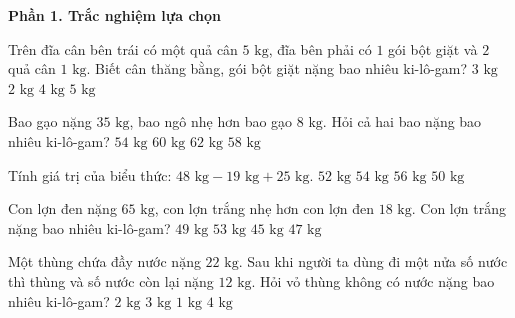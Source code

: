 \textbf{Phần 1. Trắc nghiệm lựa chọn}

\begin{ex} %
Trên đĩa cân bên trái có một quả cân $5\text{ kg}$, đĩa bên phải có $1$ gói bột giặt và $2$ quả cân $1\text{ kg}$. Biết cân thăng bằng, gói bột giặt nặng bao nhiêu ki-lô-gam?
\choice
{\True $3\text{ kg}$}
{$2\text{ kg}$}
{$4\text{ kg}$}
{$5\text{ kg}$}
\end{ex}

\begin{ex} %
Bao gạo nặng $35\text{ kg}$, bao ngô nhẹ hơn bao gạo $8\text{ kg}$. Hỏi cả hai bao nặng bao nhiêu ki-lô-gam?
\choice
{$54\text{ kg}$}
{$60\text{ kg}$}
{\True $62\text{ kg}$}
{$58\text{ kg}$}
\end{ex}

\begin{ex} %
Tính giá trị của biểu thức: $48\text{ kg} - 19\text{ kg} + 25\text{ kg}$.
\choice
{$52\text{ kg}$}
{\True $54\text{ kg}$}
{$56\text{ kg}$}
{$50\text{ kg}$}
\end{ex}

\begin{ex} %
Con lợn đen nặng $65\text{ kg}$, con lợn trắng nhẹ hơn con lợn đen $18\text{ kg}$. Con lợn trắng nặng bao nhiêu ki-lô-gam?
\choice
{$49\text{ kg}$}
{$53\text{ kg}$}
{$45\text{ kg}$}
{\True $47\text{ kg}$}
\end{ex}

\begin{ex} %
Một thùng chứa đầy nước nặng $22\text{ kg}$. Sau khi người ta dùng đi một nửa số nước thì thùng và số nước còn lại nặng $12\text{ kg}$. Hỏi vỏ thùng không có nước nặng bao nhiêu ki-lô-gam?
\choice
{\True $2\text{ kg}$}
{$3\text{ kg}$}
{$1\text{ kg}$}
{$4\text{ kg}$}
\end{ex}

